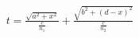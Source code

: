 \documentclass[preview]{standalone}
\begin{document}
\begin{align*}
t = \frac{\sqrt{a^2 + x^2}}{\frac{c}{n_1}} + \frac{\sqrt{b^2 + (d-x)^2}}{\frac{c}{n_2}}
\end{align*}
\end{document}
